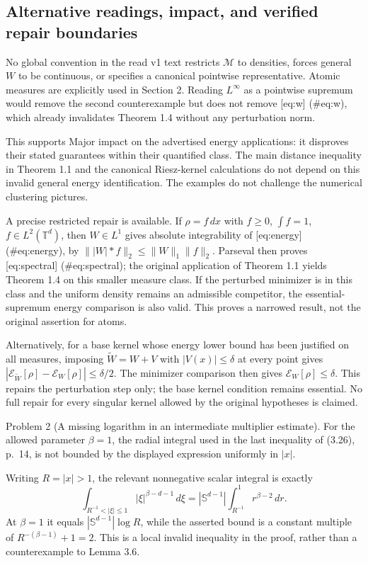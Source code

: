 \documentclass[10pt]{article}
\begin{document}
\subsection*{Alternative readings, impact, and verified repair boundaries}
No global convention in the read v1 text restricts \(\mathcal M\) to densities, forces general \(W\) to be continuous, or specifies a canonical pointwise representative. Atomic measures are explicitly used in Section 2. Reading \(L^\infty\) as a pointwise supremum would remove the second counterexample but does not remove [eq:w] (\#eq:w), which already invalidates Theorem 1.4 without any perturbation norm.\par
This supports Major impact on the advertised energy applications: it disproves their stated guarantees within their quantified class. The main distance inequality in Theorem 1.1 and the canonical Riesz-kernel calculations do not depend on this invalid general energy identification. The examples do not challenge the numerical clustering pictures.\par
A precise restricted repair is available. If \(\rho=f\,dx\) with \(f\ge0\), \(\int f=1\), \(f\in L^2(\mathbb T^d)\), then \(W\in L^1\) gives absolute integrability of [eq:energy] (\#eq:energy), by \(\||W|*f\|_2\le\|W\|_1\|f\|_2\). Parseval then proves [eq:spectral] (\#eq:spectral); the original application of Theorem 1.1 yields Theorem 1.4 on this smaller measure class. If the perturbed minimizer is in this class and the uniform density remains an admissible competitor, the essential-supremum energy comparison is also valid. This proves a narrowed result, not the original assertion for atoms.\par
Alternatively, for a base kernel whose energy lower bound has been justified on all measures, imposing \(\widetilde W=W+V\) with \(|V(x)|\le\delta\) at every point gives \(|\mathcal E_{\widetilde W}[\rho]-\mathcal E_W[\rho]|\le\delta/2\). The minimizer comparison then gives \(\mathcal E_W[\rho]\le\delta\). This repairs the perturbation step only; the base kernel condition remains essential. No full repair for every singular kernel allowed by the original hypotheses is claimed.\par
Problem 2 (A missing logarithm in an intermediate multiplier estimate).  For the allowed parameter \(\beta=1\), the radial integral used in the last inequality of (3.26), p. 14, is not bounded by the displayed expression uniformly in \(|x|\).\par
Writing \(R=|x|>1\), the relevant nonnegative scalar integral is exactly \[\int_{R^{-1}<|\xi|\le1}|\xi|^{\beta-d-1}\,d\xi
 =|\mathbb S^{d-1}|\int_{R^{-1}}^1r^{\beta-2}\,dr.\] At \(\beta=1\) it equals \(|\mathbb S^{d-1}|\log R\), while the asserted bound is a constant multiple of \(R^{-(\beta-1)}+1=2\). This is a local invalid inequality in the proof, rather than a counterexample to Lemma 3.6.\par
\end{document}
